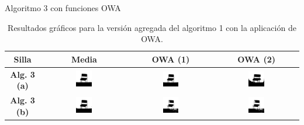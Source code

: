 \documentclass{beamer}
\theoremstyle{plain} %
\theoremstyle{definition}
\newcommand{\bb}{\bfseries}
\begin{document}
\begin{frame}{Algoritmo 3 con funciones OWA}
  \begin{table}
  \centering
  \begin{tabular}{c||c|c|c}
Silla                                &\bb Media&\bb OWA (1)&\bb OWA (2)\\\hline\hline
\bb Alg. 3 (a)  &
\includegraphics[width=0.2\textwidth]{img/res/e7/alg3aowa1chair.jpg} &
\includegraphics[width=0.2\textwidth]{img/res/e7/alg3aowa2chair.jpg} &
\includegraphics[width=0.2\textwidth]{img/res/e7/alg3aowa3chair.jpg} \\
\bb Alg. 3 (b)  &
\includegraphics[width=0.2\textwidth]{img/res/e7/alg3bowa1chair.jpg} &
\includegraphics[width=0.2\textwidth]{img/res/e7/alg3bowa2chair.jpg} &
\includegraphics[width=0.2\textwidth]{img/res/e7/alg3bowa3chair.jpg} \\\hline
  \end{tabular}
  \caption{Resultados gráficos para la versión agregada del algoritmo 1 con la aplicación de OWA.}
  \end{table}
\end{frame}
\end{document}

